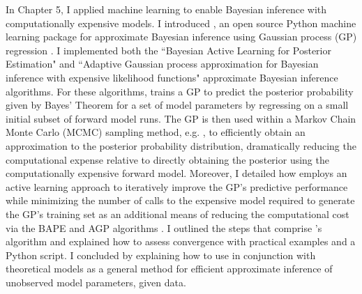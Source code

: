 In Chapter 5, I applied machine learning to enable Bayesian inference with computationally expensive models. I introduced \approxposterior, an open source Python machine learning package for approximate Bayesian inference using Gaussian process (GP) regression \citep{FlemingVanderPlas2018}. I implemented both the ``Bayesian Active Learning for Posterior Estimation"  \citep[BAPE,][]{Kandasamy2017} and ``Adaptive Gaussian process approximation for Bayesian inference with expensive likelihood functions" \citep[AGP,][]{Wang2018} approximate Bayesian inference algorithms. For these algorithms, \approxposterior trains a GP to predict the posterior probability given by Bayes' Theorem for a set of model parameters by regressing on a small initial subset of forward model runs. The GP is then used within a Markov Chain Monte Carlo (MCMC) sampling method, e.g. \emcee \citep{ForemanMackey2013}, to efficiently obtain an approximation to the posterior probability distribution, dramatically reducing the computational expense relative to directly obtaining the posterior using the computationally expensive forward model. Moreover, I detailed how \approxposterior employs an active learning approach to iteratively improve the GP's predictive performance while minimizing the number of calls to the expensive model required to generate the GP's training set as an additional means of reducing the computational cost via the BAPE and AGP algorithms \citep{Kandasamy2017,Wang2018}.  I outlined the steps that comprise \approxposterior's algorithm and explained how to assess convergence with practical examples and a Python script. I concluded by explaining how to use \approxposterior in conjunction with theoretical models as a general method for efficient approximate inference of unobserved model parameters, given data.
 
